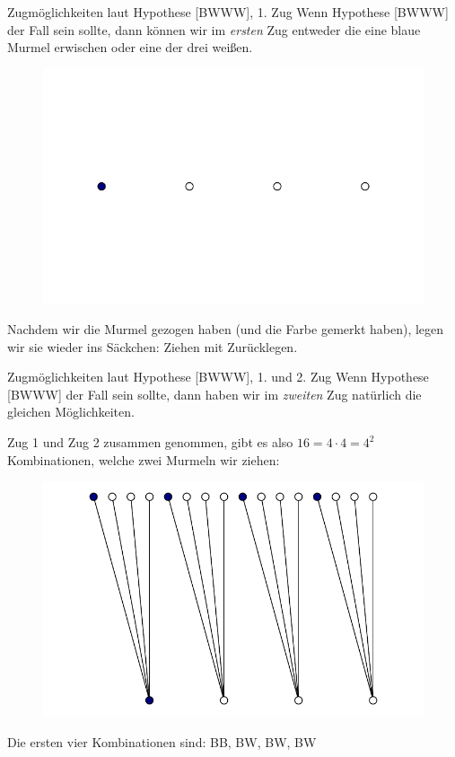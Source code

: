 \documentclass[
  ngerman,
  ignorenonframetext,
]{beamer}
\begin{document}
\begin{frame}{Zugmöglichkeiten laut Hypothese {[}BWWW{]}, 1. Zug}
\protect\hypertarget{zugmuxf6glichkeiten-laut-hypothese-bwww-1.-zug}{}
Wenn Hypothese {[}BWWW{]} der Fall sein sollte, dann können wir im
\emph{ersten} Zug entweder die eine blaue Murmel erwischen oder eine der
drei weißen.

\begin{figure}[H]
\includegraphics[width=0.5\linewidth]{unnamed-chunk-5-1} \end{figure}

Nachdem wir die Murmel gezogen haben (und die Farbe gemerkt haben),
legen wir sie wieder ins Säckchen: Ziehen mit Zurücklegen.
\end{frame}

\begin{frame}{Zugmöglichkeiten laut Hypothese {[}BWWW{]}, 1. und 2. Zug}
\protect\hypertarget{zugmuxf6glichkeiten-laut-hypothese-bwww-1.-und-2.-zug}{}
Wenn Hypothese {[}BWWW{]} der Fall sein sollte, dann haben wir im
\emph{zweiten} Zug natürlich die gleichen Möglichkeiten.

Zug 1 und Zug 2 zusammen genommen, gibt es also \(16=4\cdot4=4^2\)
Kombinationen, welche zwei Murmeln wir ziehen:

\begin{figure}[H]
\includegraphics[width=0.5\linewidth]{unnamed-chunk-6-1} \end{figure}

Die ersten vier Kombinationen sind: BB, BW, BW, BW
\end{frame}
\end{document}
